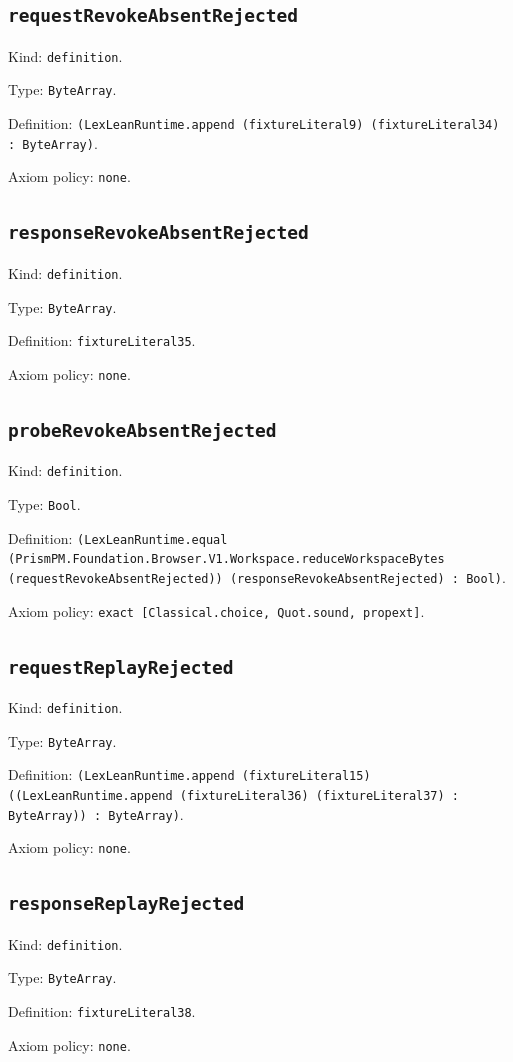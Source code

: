 \documentclass[11pt]{article}
\begin{document}
\subsection*{\texttt{requestRevokeAbsentRejected}}
\noindent Kind: \texttt{definition}.\par
\noindent Type: \texttt{ByteArray}.\par
\noindent Definition: \texttt{(LexLeanRuntime.append (fixtureLiteral9) (fixtureLiteral34) : ByteArray)}.\par
\noindent Axiom policy: \texttt{none}.\par
\subsection*{\texttt{responseRevokeAbsentRejected}}
\noindent Kind: \texttt{definition}.\par
\noindent Type: \texttt{ByteArray}.\par
\noindent Definition: \texttt{fixtureLiteral35}.\par
\noindent Axiom policy: \texttt{none}.\par
\subsection*{\texttt{probeRevokeAbsentRejected}}
\noindent Kind: \texttt{definition}.\par
\noindent Type: \texttt{Bool}.\par
\noindent Definition: \texttt{(LexLeanRuntime.equal (PrismPM.Foundation.Browser.V1.Workspace.reduceWorkspaceBytes (requestRevokeAbsentRejected)) (responseRevokeAbsentRejected) : Bool)}.\par
\noindent Axiom policy: \texttt{exact [Classical.choice, Quot.sound, propext]}.\par
\subsection*{\texttt{requestReplayRejected}}
\noindent Kind: \texttt{definition}.\par
\noindent Type: \texttt{ByteArray}.\par
\noindent Definition: \texttt{(LexLeanRuntime.append (fixtureLiteral15) ((LexLeanRuntime.append (fixtureLiteral36) (fixtureLiteral37) : ByteArray)) : ByteArray)}.\par
\noindent Axiom policy: \texttt{none}.\par
\subsection*{\texttt{responseReplayRejected}}
\noindent Kind: \texttt{definition}.\par
\noindent Type: \texttt{ByteArray}.\par
\noindent Definition: \texttt{fixtureLiteral38}.\par
\noindent Axiom policy: \texttt{none}.\par
\end{document}
